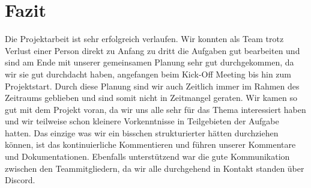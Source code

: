 \documentclass{article}
\begin{document}
\section{Fazit}
Die Projektarbeit ist sehr erfolgreich verlaufen. Wir konnten als Team trotz Verlust einer Person direkt zu Anfang zu dritt die Aufgaben gut bearbeiten und sind am Ende mit unserer gemeinsamen Planung sehr gut durchgekommen, da wir sie gut durchdacht haben, angefangen beim Kick-Off Meeting bis hin zum Projektstart. Durch diese Planung sind wir auch Zeitlich immer im Rahmen des Zeitraums geblieben und sind somit nicht in Zeitmangel geraten. Wir kamen so gut mit dem Projekt voran, da wir uns alle sehr für das Thema interessiert haben und wir teilweise schon kleinere Vorkenntnisse in Teilgebieten der Aufgabe hatten. Das einzige was wir ein bisschen strukturierter hätten durchziehen können, ist das kontinuierliche Kommentieren und führen unserer Kommentare und Dokumentationen. Ebenfalls unterstützend war die gute Kommunikation zwischen den Teammitgliedern, da wir alle durchgehend in Kontakt standen über Discord.
\end{document}
